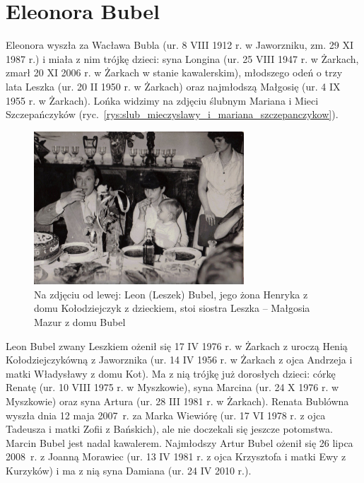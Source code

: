 \section{Eleonora Bubel}

Eleonora wyszła za Wacława Bubla (ur. 8 VIII 1912 r. w Jaworzniku, zm. 29 XI 1987 r.) i miała z nim trójkę dzieci: syna Longina (ur. 25 VIII 1947 r. w Żarkach, zmarł 20 XI 2006 r. w Żarkach w stanie kawalerskim), młodszego odeń o trzy lata Leszka (ur. 20 II 1950 r. w Żarkach) oraz najmłodszą Małgosię (ur. 4 IX 1955 r. w Żarkach). Lońka widzimy na zdjęciu ślubnym Mariana i Mieci Szczepańczyków (ryc.~\ref{rys:slub_mieczyslawy_i_mariana_szczepanczykow}).

\begin{figure}
\begin{center}
\includegraphics[width=0.7\textwidth]{zdjecia/leon_henryka_malgosia_bubel.jpg}
\caption[Leon, Henryka i Małgorzata Bublowie]{Na zdjęciu od lewej: Leon (Leszek) Bubel, jego żona Henryka z domu Kołodziejczyk z dzieckiem, stoi siostra Leszka -- Małgosia Mazur z domu Bubel}
\label{rys:leon_henryka_malgosia_bubel}
\end{center}
\end{figure}

Leon Bubel zwany Leszkiem ożenił się 17 IV 1976 r. w Żarkach z uroczą Henią Kołodziejczykówną z Jaworznika (ur. 14 IV 1956 r. w Żarkach z ojca Andrzeja i matki Władysławy z domu Kot). Ma z nią trójkę już dorosłych dzieci: córkę Renatę (ur. 10 VIII 1975 r. w Myszkowie), syna Marcina (ur. 24 X 1976 r. w Myszkowie) oraz syna Artura (ur. 28 III 1981 r. w Żarkach). Renata Bublówna wyszła dnia 12 maja 2007~r. za Marka Wiewiórę (ur. 17 VI 1978 r. z ojca Tadeusza i matki Zofii z Bańskich), ale nie doczekali się jeszcze potomstwa. Marcin Bubel jest nadal kawalerem. Najmłodszy Artur Bubel ożenił się 26 lipca 2008~r. z Joanną Morawiec (ur. 13 IV 1981 r. z ojca Krzysztofa i matki Ewy z Kurzyków) i ma z nią syna Damiana (ur. 24 IV 2010 r.).

